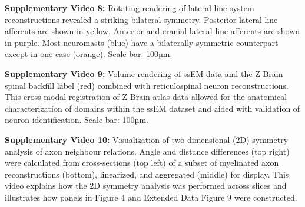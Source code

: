 \documentclass{article}
\begin{document}
\textbf{Supplementary Video 8:} Rotating rendering of lateral line system reconstructions revealed a striking bilateral symmetry. Posterior lateral line afferents are shown in yellow. Anterior and cranial lateral line afferents are shown in purple. Most neuromasts (blue) have a bilaterally symmetric counterpart except in one case (orange). Scale bar: 100µm.

\textbf{Supplementary Video 9:} Volume rendering of ssEM data and the Z-Brain spinal backfill label (red) combined with reticulospinal neuron reconstructions. This cross-modal registration of Z-Brain atlas data allowed for the anatomical characterization of domains within the ssEM dataset and aided with validation of neuron identification. Scale bar: 100µm.

\textbf{Supplementary Video 10:} Visualization of two-dimensional (2D) symmetry analysis of axon neighbour relations. Angle and distance differences (top right) were calculated from cross-sections (top left) of a subset of myelinated axon reconstructions (bottom), linearized, and
aggregated (middle) for display. This video explains how the 2D symmetry analysis was performed across slices and illustrates how panels in Figure 4 and Extended Data Figure 9 were constructed.
\end{document}
